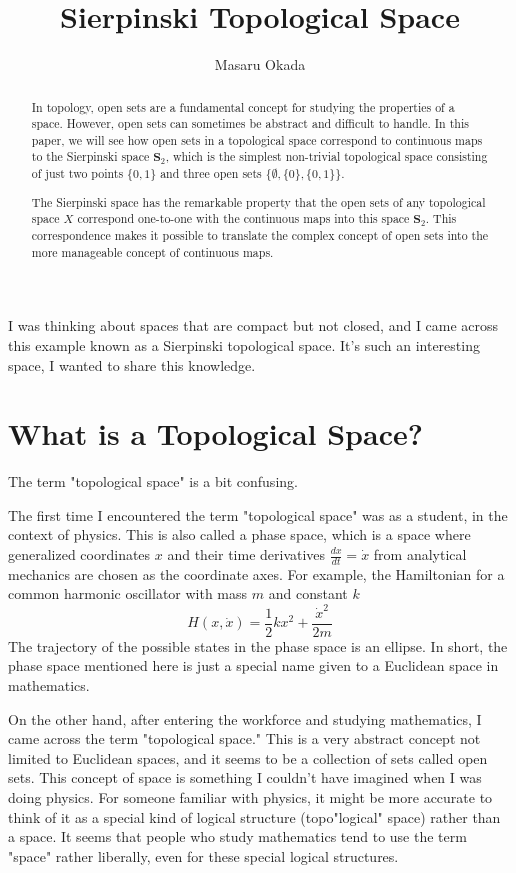 \documentclass{article}
\title{
Sierpinski Topological Space
}
\author{
Masaru Okada
}
\begin{document}
\maketitle

I was thinking about spaces that are compact but not closed, and I came across this example known as a Sierpinski topological space. It's such an interesting space, I wanted to share this knowledge.

\begin{abstract}
	In topology, open sets are a fundamental concept for studying the properties of a space. However, open sets can sometimes be abstract and difficult to handle. In this paper, we will see how open sets in a topological space correspond to continuous maps to the Sierpinski space $\mathbf{S}_ {2}$, which is the simplest non-trivial topological space consisting of just two points $\{0, 1\}$ and three open sets $\{\emptyset, \{0\}, \{0, 1\}\}$.

	The Sierpinski space has the remarkable property that the open sets of any topological space $X$ correspond one-to-one with the continuous maps into this space $\mathbf{S}_ {2}$. This correspondence makes it possible to translate the complex concept of open sets into the more manageable concept of continuous maps.
\end{abstract}

\section{What is a Topological Space?}

The term "topological space" is a bit confusing.

The first time I encountered the term "topological space" was as a student, in the context of physics.
This is also called a phase space,
which is a space where generalized coordinates $x$ and their time derivatives $\frac{dx}{dt} = \dot{x}$ from analytical mechanics are chosen as the coordinate axes.
For example, the Hamiltonian for a common harmonic oscillator with mass $m$ and constant $k$
$$
	H(x,\dot{x}) = \frac{1}{2}kx^{2} + \frac{\dot{x}^{2}}{2m}
$$
The trajectory of the possible states in the phase space is an ellipse.
In short, the phase space mentioned here is just a special name given to a Euclidean space in mathematics.

On the other hand, after entering the workforce and studying mathematics, I came across the term "topological space."
This is a very abstract concept not limited to Euclidean spaces, and it seems to be a collection of sets called open sets.
This concept of space is something I couldn't have imagined when I was doing physics. For someone familiar with physics, it might be more accurate to think of it as a special kind of logical structure (topo"logical" space) rather than a space.
It seems that people who study mathematics tend to use the term "space" rather liberally, even for these special logical structures.
\end{document}
